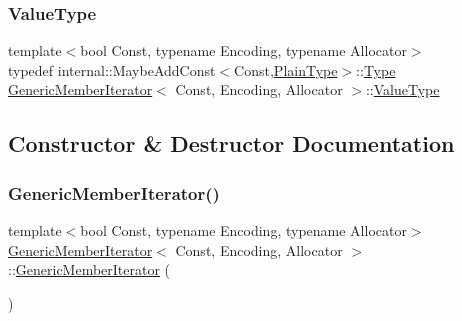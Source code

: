\mbox{\label{classGenericMemberIterator_a1323c9d064a9c388a1eb62a6e2c17584}} 
\subsubsection{\texorpdfstring{Value\+Type}{ValueType}}
{\footnotesize\ttfamily template$<$bool Const, typename Encoding, typename Allocator$>$ \\
typedef internal\+::\+Maybe\+Add\+Const$<$Const,\hyperlink{classGenericMemberIterator_ac0d50d12ba074e68837964244668c66b}{Plain\+Type}$>$\+::\hyperlink{rapidjson_8h_a1d1cfd8ffb84e947f82999c682b666a7}{Type} \hyperlink{classGenericMemberIterator}{Generic\+Member\+Iterator}$<$ Const, Encoding, Allocator $>$\+::\hyperlink{classGenericMemberIterator_a1323c9d064a9c388a1eb62a6e2c17584}{Value\+Type}\hspace{0.3cm}{\ttfamily [private]}}



\subsection{Constructor \& Destructor Documentation}
\mbox{\label{classGenericMemberIterator_a2708717d497a0aadacdf75900de4c5b4}} 
\subsubsection{\texorpdfstring{Generic\+Member\+Iterator()}{GenericMemberIterator()}\hspace{0.1cm}{\footnotesize\ttfamily [1/3]}}
{\footnotesize\ttfamily template$<$bool Const, typename Encoding, typename Allocator$>$ \\
\hyperlink{classGenericMemberIterator}{Generic\+Member\+Iterator}$<$ Const, Encoding, Allocator $>$\+::\hyperlink{classGenericMemberIterator}{Generic\+Member\+Iterator} (\begin{DoxyParamCaption}{ }\end{DoxyParamCaption})\hspace{0.3cm}{\ttfamily [inline]}}



